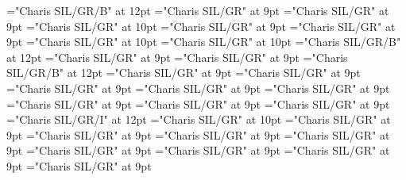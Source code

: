 \documentclass[gps1,twoside]{article}
\begin{document}
\font\nontrivialentryrootnontrivialentryrootscomplexformsnotsubentrycomplexformsnotsubentriesentry="Charis SIL/GR/B" at 12pt
\font\spanspanpicturesentrybefore="Charis SIL/GR" at 9pt
\font\picturesentryafter="Charis SIL/GR" at 9pt
\font\picturepicturesentry="Charis SIL/GR" at 10pt
\font\picturepicturesentryafter="Charis SIL/GR" at 9pt
\font\spanspancaptionpicturepicturesentrybefore="Charis SIL/GR" at 9pt
\font\paracontinuationsubentriesentry="Charis SIL/GR" at 10pt
\font\subentrysubentriesentry="Charis SIL/GR" at 10pt
\font\spanbzhheadwordsubentrysubentriesentry="Charis SIL/GR/B" at 12pt
\font\spanspanheadwordsubentrysubentriesentrybefore="Charis SIL/GR" at 9pt
\font\spanheadwordsubentrysubentriesentrylastchildafter="Charis SIL/GR" at 9pt
\font\spanheadwordsubentrysubentriesentry="Charis SIL/GR/B" at 12pt
\font\complexformtypessubentrysubentriesentryafter="Charis SIL/GR" at 9pt
\font\spanspanreverseabbrcomplexformtypecomplexformtypessubentrysubentriesentrybefore="Charis SIL/GR" at 9pt
\font\pronunciationpronunciationpronunciationssubentrysubentriesentrybefore="Charis SIL/GR" at 9pt
\font\pronunciationssubentrysubentriesentryafter="Charis SIL/GR" at 9pt
\font\spanspanformpronunciationpronunciationssubentrysubentriesentrybefore="Charis SIL/GR" at 9pt
\font\spanformpronunciationpronunciationssubentrysubentriesentryfirstchildbefore="Charis SIL/GR" at 9pt
\font\spanformpronunciationpronunciationssubentrysubentriesentrylastchildafter="Charis SIL/GR" at 9pt
\font\locationpronunciationpronunciationssubentrysubentriesentryafter="Charis SIL/GR" at 9pt
\font\locationpronunciationpronunciationssubentrysubentriesentry="Charis SIL/GR/I" at 12pt
\font\spanwritingsystemprefixspanabbreviationlocationpronunciationpronunciationssubentrysubentriesentry="Charis SIL/GR" at 10pt
\font\spanwritingsystemprefixspanabbreviationlocationpronunciationpronunciationssubentrysubentriesentryafter="Charis SIL/GR" at 9pt
\font\spanspanabbreviationlocationpronunciationpronunciationssubentrysubentriesentrybefore="Charis SIL/GR" at 9pt
\font\spanabbreviationlocationpronunciationpronunciationssubentrysubentriesentrylastchildafter="Charis SIL/GR" at 9pt
\font\spanspannamelocationpronunciationpronunciationssubentrysubentriesentrybefore="Charis SIL/GR" at 9pt
\font\spannamelocationpronunciationpronunciationssubentrysubentriesentrylastchildafter="Charis SIL/GR" at 9pt
\font\spanspanaliaslocationpronunciationpronunciationssubentrysubentriesentrybefore="Charis SIL/GR" at 9pt
\font\spanaliaslocationpronunciationpronunciationssubentrysubentriesentrylastchildafter="Charis SIL/GR" at 9pt
\font\spanspanvariantformentrybackrefssubentrysubentriesentrybefore="Charis SIL/GR" at 9pt
\end{document}
